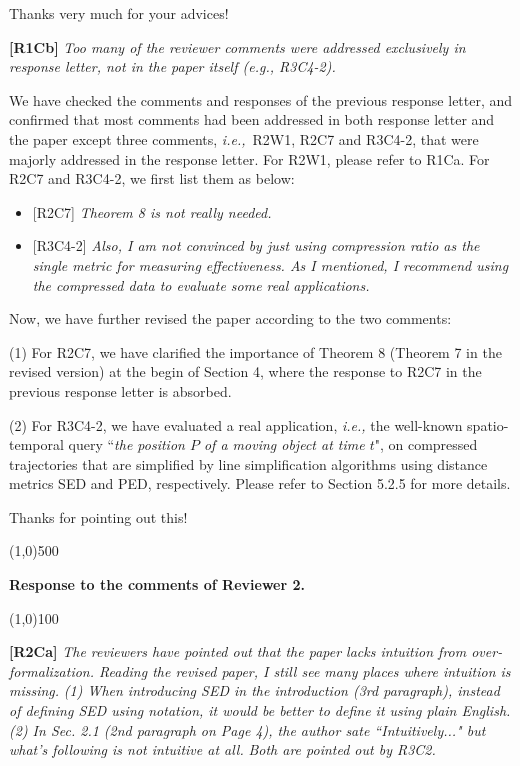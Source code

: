 \documentclass{letter}
\newcommand{\ie}{\emph{i.e.,}\xspace}
\begin{document}
Thanks very much for your advices!


\textbf{[R1Cb]} \emph{Too many of the reviewer comments were addressed exclusively in response letter, not in the paper itself (e.g., {R3C4-2}).}

We have checked the comments and responses of the previous response letter, and confirmed that most comments had been addressed in both response letter and the paper except three comments, \ie~{R2W1}, {R2C7} and {R3C4-2}, that were majorly addressed in the response letter. For R2W1, please refer to R1Ca. For R2C7 and R3C4-2, we first list them as below:
\begin{itemize}

  \item {{[R2C7]} \emph{Theorem 8 is not really needed.}}

  \item {{[R3C4-2]} \emph{Also, I am not convinced by just using compression ratio as the single metric for measuring effectiveness. As I mentioned, I recommend using the compressed data to evaluate some real applications.}
}
\end{itemize}

Now, we have further revised the paper according to the two comments:

(1) For {R2C7}, we have clarified the importance of Theorem 8 (Theorem 7 in the revised version) at the begin of Section 4, where the response to R2C7 in the previous response letter is absorbed.

(2) For {R3C4-2}, we have evaluated a real application, \ie the well-known spatio-temporal query ``\emph{the position $P$ of a moving object at time $t$}", on compressed trajectories that are simplified by line simplification algorithms using distance metrics SED and PED, respectively. Please refer to Section 5.2.5 for more details.

Thanks for pointing out this!





\line(1,0){500}

\textbf{Response to the comments of Reviewer 2.}

\line(1,0){100}


\textbf{[R2Ca]} \emph{The reviewers have pointed out that the paper lacks intuition from over-formalization. Reading the revised paper, I still see many places where intuition is missing.}
\emph{(1) When introducing SED in the introduction (3rd paragraph), instead of defining SED using notation, it would be better to define it using plain English.}
\emph{(2) In Sec. 2.1 (2nd paragraph on Page 4), the author sate ``Intuitively..." but what's following is not intuitive at all.}
\emph{Both are pointed out by {R3C2}.}
\end{document}
